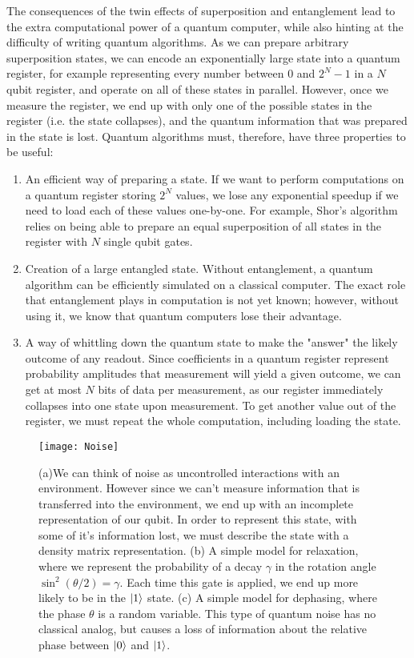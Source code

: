 The consequences of the twin effects of superposition and entanglement lead to the extra computational
power of a quantum computer, while also hinting at the difficulty of writing quantum algorithms. As we
can prepare arbitrary superposition states, we can encode an exponentially large
state into a quantum register, for example representing every number between 0 and $2^N-1$ in a $N$ qubit
register, and operate on all of these states in parallel. However, once we measure the register, we end up
with only one of the possible states in the register (i.e. the state collapses), and the quantum information
that was prepared in the state is lost. Quantum algorithms must, therefore, have three properties to be useful:
\begin{enumerate}
  \item An efficient way of preparing a state. If we want to perform computations on a quantum register
    storing $2^N$ values, we lose any exponential speedup if we need to load each of these values one-by-one.
    For example, Shor's algorithm relies on being able to prepare an equal superposition of all states
    in the register with $N$ single qubit gates\cite{PhysRevA.54.1034}.
  \item Creation of a large entangled state. Without entanglement, a quantum algorithm can be efficiently
    simulated on a classical computer. The exact role that entanglement plays in computation is not yet known;
    however, without using it, we know that quantum computers lose their advantage\cite{doi:10.1098/rspa.2002.1097}.
  \item A way of whittling down the quantum state to make the "answer" the likely outcome of any readout.
    Since coefficients in a quantum register represent probability amplitudes that measurement will yield
    a given outcome, we can get at most $N$ bits of data per measurement\cite{651037}, as our register
    immediately collapses into one state upon measurement. To get another value out of the register,
    we must repeat the whole computation, including loading the state.
\end{enumerate}

\begin{figure}
  \texttt{[image: Noise]}
  \caption[Noise affecting pure states]
  {(a)We can think of noise as uncontrolled interactions with an environment. However since we can't measure
  information that is transferred into the environment, we end up with an incomplete representation of our qubit.
  In order to represent this state, with some of it's information lost, we must describe the state with a density
  matrix representation. (b) A simple model for relaxation, where we represent the probability of a decay $\gamma$
  in the rotation angle $\sin^2(\theta/2) = \gamma$. Each time this gate is applied, we end up more likely to be in
  the $\ket{1}$ state. (c) A simple model for dephasing, where the phase $\theta$ is a random variable. This type
  of quantum noise has no classical analog, but causes a loss of information about the relative phase between $\ket{0}$
  and $\ket{1}$.}
  \label{fig:noise}
\end{figure}

